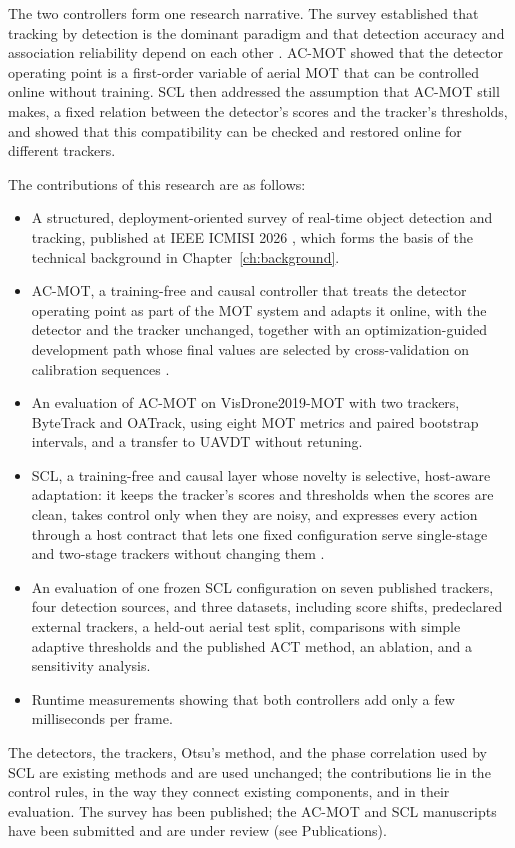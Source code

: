 The two controllers form one research narrative. The survey established that tracking by detection is the dominant paradigm and that detection accuracy and association reliability depend on each other \cite{ismail2026realtime}. AC-MOT showed that the detector operating point is a first-order variable of aerial MOT that can be controlled online without training. SCL then addressed the assumption that AC-MOT still makes, a fixed relation between the detector's scores and the tracker's thresholds, and showed that this compatibility can be checked and restored online for different trackers.

The contributions of this research are as follows:
\begin{itemize}
\item A structured, deployment-oriented survey of real-time object detection and tracking, published at IEEE ICMISI 2026 \cite{ismail2026realtime}, which forms the basis of the technical background in Chapter~\ref{ch:background}.
\item AC-MOT, a training-free and causal controller that treats the detector operating point as part of the MOT system and adapts it online, with the detector and the tracker unchanged, together with an optimization-guided development path whose final values are selected by cross-validation on calibration sequences \cite{ismail2026acmot}.
\item An evaluation of AC-MOT on VisDrone2019-MOT with two trackers, ByteTrack and OATrack, using eight MOT metrics and paired bootstrap intervals, and a transfer to UAVDT without retuning.
\item SCL, a training-free and causal layer whose novelty is selective, host-aware adaptation: it keeps the tracker's scores and thresholds when the scores are clean, takes control only when they are noisy, and expresses every action through a host contract that lets one fixed configuration serve single-stage and two-stage trackers without changing them \cite{ismail2026scl}.
\item An evaluation of one frozen SCL configuration on seven published trackers, four detection sources, and three datasets, including score shifts, predeclared external trackers, a held-out aerial test split, comparisons with simple adaptive thresholds and the published ACT method, an ablation, and a sensitivity analysis.
\item Runtime measurements showing that both controllers add only a few milliseconds per frame.
\end{itemize}
The detectors, the trackers, Otsu's method, and the phase correlation used by SCL are existing methods and are used unchanged; the contributions lie in the control rules, in the way they connect existing components, and in their evaluation. The survey has been published; the AC-MOT and SCL manuscripts have been submitted and are under review (see Publications).

